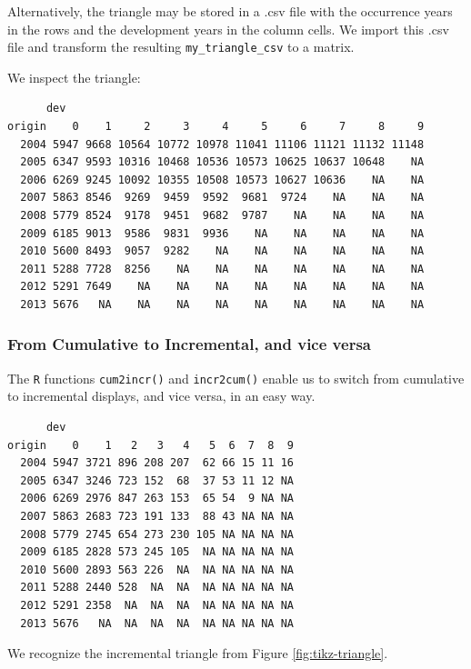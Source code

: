 \documentclass[]{book}
\begin{document}
Alternatively, the triangle may be stored in a .csv file with the
occurrence years in the rows and the development years in the column
cells. We import this .csv file and transform the resulting
\texttt{my\_triangle\_csv} to a matrix.

We inspect the triangle:

\begin{verbatim}
      dev
origin    0    1     2     3     4     5     6     7     8     9
  2004 5947 9668 10564 10772 10978 11041 11106 11121 11132 11148
  2005 6347 9593 10316 10468 10536 10573 10625 10637 10648    NA
  2006 6269 9245 10092 10355 10508 10573 10627 10636    NA    NA
  2007 5863 8546  9269  9459  9592  9681  9724    NA    NA    NA
  2008 5779 8524  9178  9451  9682  9787    NA    NA    NA    NA
  2009 6185 9013  9586  9831  9936    NA    NA    NA    NA    NA
  2010 5600 8493  9057  9282    NA    NA    NA    NA    NA    NA
  2011 5288 7728  8256    NA    NA    NA    NA    NA    NA    NA
  2012 5291 7649    NA    NA    NA    NA    NA    NA    NA    NA
  2013 5676   NA    NA    NA    NA    NA    NA    NA    NA    NA
\end{verbatim}

\subsubsection*{From Cumulative to Incremental, and vice
versa}\label{from-cumulative-to-incremental-and-vice-versa}

The \texttt{R} functions \texttt{cum2incr()} and \texttt{incr2cum()}
enable us to switch from cumulative to incremental displays, and vice
versa, in an easy way.

\begin{verbatim}
      dev
origin    0    1   2   3   4   5  6  7  8  9
  2004 5947 3721 896 208 207  62 66 15 11 16
  2005 6347 3246 723 152  68  37 53 11 12 NA
  2006 6269 2976 847 263 153  65 54  9 NA NA
  2007 5863 2683 723 191 133  88 43 NA NA NA
  2008 5779 2745 654 273 230 105 NA NA NA NA
  2009 6185 2828 573 245 105  NA NA NA NA NA
  2010 5600 2893 563 226  NA  NA NA NA NA NA
  2011 5288 2440 528  NA  NA  NA NA NA NA NA
  2012 5291 2358  NA  NA  NA  NA NA NA NA NA
  2013 5676   NA  NA  NA  NA  NA NA NA NA NA
\end{verbatim}

We recognize the incremental triangle from Figure
\ref{fig:tikz-triangle}.
\end{document}
